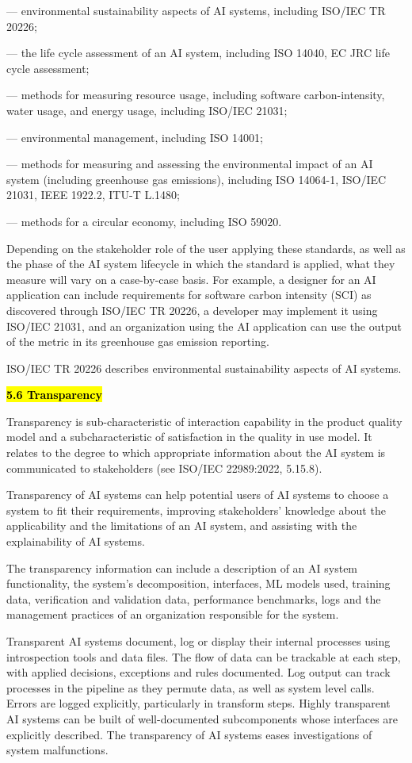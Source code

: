 \documentclass[
  letterpaper,
  DIV=11,
  numbers=noendperiod,
  oneside]{scrreprt}
\begin{document}
\begin{tcolorbox}
--- environmental sustainability aspects of AI systems, including
ISO/IEC TR 20226;

--- the life cycle assessment of an AI system, including ISO 14040, EC
JRC life cycle assessment;

--- methods for measuring resource usage, including software
carbon-intensity, water usage, and energy usage, including ISO/IEC
21031;

--- environmental management, including ISO 14001;

--- methods for measuring and assessing the environmental impact of an
AI system (including greenhouse gas emissions), including ISO 14064-1,
ISO/IEC 21031, IEEE 1922.2, ITU-T L.1480;

--- methods for a circular economy, including ISO 59020.

Depending on the stakeholder role of the user applying these standards,
as well as the phase of the AI system lifecycle in which the standard is
applied, what they measure will vary on a case-by-case basis. For
example, a designer for an AI application can include requirements for
software carbon intensity (SCI) as discovered through ISO/IEC TR 20226,
a developer may implement it using ISO/IEC 21031, and an organization
using the AI application can use the output of the metric in its
greenhouse gas emission reporting.

ISO/IEC TR 20226 describes environmental sustainability aspects of AI
systems.

\textbf{\hl{5.6 Transparency}}

Transparency is sub-characteristic of interaction capability in the
product quality model and a subcharacteristic of satisfaction in the
quality in use model. It relates to the degree to which appropriate
information about the AI system is communicated to stakeholders (see
ISO/IEC 22989:2022, 5.15.8).

Transparency of AI systems can help potential users of AI systems to
choose a system to fit their requirements, improving stakeholders'
knowledge about the applicability and the limitations of an AI system,
and assisting with the explainability of AI systems.

The transparency information can include a description of an AI system
functionality, the system's decomposition, interfaces, ML models used,
training data, verification and validation data, performance benchmarks,
logs and the management practices of an organization responsible for the
system.

Transparent AI systems document, log or display their internal processes
using introspection tools and data files. The flow of data can be
trackable at each step, with applied decisions, exceptions and rules
documented. Log output can track processes in the pipeline as they
permute data, as well as system level calls. Errors are logged
explicitly, particularly in transform steps. Highly transparent AI
systems can be built of well-documented subcomponents whose interfaces
are explicitly described. The transparency of AI systems eases
investigations of system malfunctions.


\end{tcolorbox}
\end{document}
